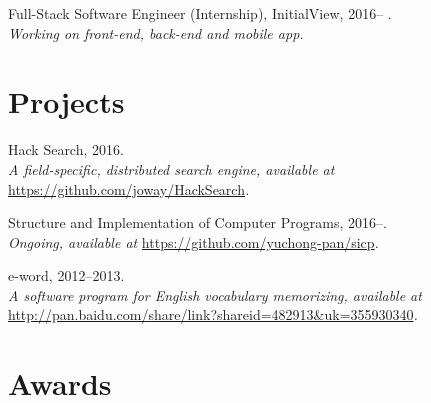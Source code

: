 \documentclass[letterpaper]{article}
\renewenvironment{itemize}{
  \begin{list}{}{
    \setlength{\leftmargin}{1.5em}
  }
}{
  \end{list}
}
\begin{document}
\begin{itemize}
  \item Full-Stack Software Engineer (Internship), InitialView, 2016-- .\\
  \emph{Working on front-end, back-end and mobile app.}
\end{itemize}


\section*{Projects}

\begin{itemize}
  \item Hack Search, 2016.\\
  \emph{A field-specific, distributed search engine, available at }\url{https://github.com/joway/HackSearch}\emph{.}

  \item Structure and Implementation of Computer Programs, 2016--.\\
  \emph{Ongoing, available at }\url{https://github.com/yuchong-pan/sicp}\emph{.}

  \item e-word, 2012--2013.\\
  \emph{A software program for English vocabulary memorizing, available at }\url{http://pan.baidu.com/share/link?shareid=482913&uk=355930340}\emph{.}

\end{itemize}


\section*{Awards}
\end{document}
